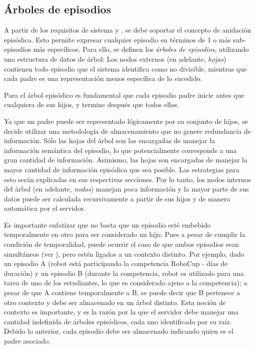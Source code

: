 \subsection{Árboles de episodios}

A partir de los requisitos de sistema  y , se debe soportar el concepto de anidación episódica. Esto permite expresar cualquier episodio en términos de 1 o más sub-episodios más específicos. Para ello, se definen los \textit{árboles de episodios}, utilizando una estructura de datos de árbol: Los nodos externos (en adelante, \textit{hojas}) contienen todo episodio que el sistema identifica como no divisible, mientras que cada padre es una representación menos específica de lo sucedido.

Para el árbol episódico es fundamental que cada episodio padre inicie antes que cualquiera de sus hijos, y termine después que todos ellos. 

Ya que un padre puede ser representado lógicamente por su conjunto de hijos, se decide utilizar una metodología de almacenamiento que no genere redundancia de información. Sólo las hojas del árbol son las encargadas de manejar la información semántica del episodio, lo que potencialmente corresponde a una gran cantidad de información. Asimismo, las hojas son encargadas de manejar la mayor cantidad de información episódica que sea posible. Las estrategias para esto serán explicadas en sus respectivas secciones. Por lo tanto, los nodos internos del árbol (en adelante, \textit{nodos}) manejan poca información y la mayor parte de sus datos puede ser calculada recursivamente a partir de sus hijos y de manera automática por el servidor.

Es importante enfatizar que no basta que un episodio esté embebido temporalmente en otro para ser considerado un hijo. Pues a pesar de cumplir la condición de temporalidad, puede ocurrir el caso de que ambos episodios sean simultáneos (ver ), pero estén ligados a un contexto distinto. Por ejemplo, dado un episodio A (robot está participando la competencia RoboCup - días de duración) y un episodio B (durante la competencia, robot es utilizado para una tarea de uno de los estudiantes, lo que es considerado ajeno a la competencia); a pesar de que A contiene temporalmente a B, se puede decir que B pertenece a otro contexto y debe ser almacenado en un árbol distinto. Esta noción de contexto es importante, y es la razón por la que el servidor debe manejar una cantidad indefinida de árboles episódicos, cada uno identificado por su raíz. Debido lo anterior, cada episodio debe ser almacenado indicando quien es el padre asociado.



